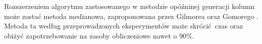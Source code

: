 Rozszerzeniem algorytmu zastosowanego w metodzie opóźninej generacji kolumn może zostać metoda medianowa, zaproponowana przez Gilmorea oraz Gomorego \cite{GilmoreGomoryV2Article}. Metoda ta według przeprowadzonych eksperymentów może skrócić czas oraz obiżyć zapotrzebowanie na zasoby obliczeniowe nawet o 90\%.
